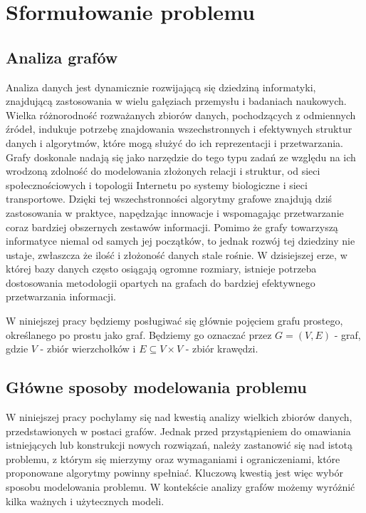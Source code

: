 \chapter{Sformułowanie problemu}

\section{Analiza grafów}

    Analiza danych jest dynamicznie rozwijającą się dziedziną informatyki, znajdującą zastosowania w wielu gałęziach przemysłu i badaniach naukowych. Wielka różnorodność rozważanych zbiorów danych, pochodzących z odmiennych źródeł, indukuje potrzebę znajdowania wszechstronnych i efektywnych struktur danych i algorytmów, które mogą służyć do ich reprezentacji i przetwarzania. Grafy doskonale nadają się jako narzędzie do tego typu zadań ze względu na ich wrodzoną zdolność do modelowania złożonych relacji i struktur, od sieci społecznościowych i topologii Internetu po systemy biologiczne i sieci transportowe. Dzięki tej wszechstronności algorytmy grafowe znajdują dziś zastosowania w praktyce, napędzając innowacje i wspomagając przetwarzanie coraz bardziej obszernych zestawów informacji. Pomimo że grafy towarzyszą informatyce niemal od samych jej początków, to jednak rozwój tej dziedziny nie ustaje, zwłaszcza że ilość i złożoność danych stale rośnie. W dzisiejszej erze, w której bazy danych często osiągają ogromne rozmiary, istnieje potrzeba dostosowania metodologii opartych na grafach do bardziej efektywnego przetwarzania informacji. 

    W niniejszej pracy będziemy posługiwać się głównie pojęciem grafu prostego, określanego po prostu jako graf. Będziemy go oznaczać przez $G = (V,E)$ - graf, gdzie $V$ - zbiór wierzchołków i $E \subseteq V \times V$ - zbiór krawędzi.

\section{Główne sposoby modelowania problemu}
    W niniejszej pracy pochylamy się nad kwestią analizy wielkich zbiorów danych, przedstawionych w postaci grafów. Jednak przed przystąpieniem do omawiania istniejących lub konstrukcji nowych rozwiązań, należy zastanowić się nad istotą problemu, z którym się mierzymy oraz wymaganiami i ograniczeniami, które proponowane algorytmy powinny spełniać. Kluczową kwestią jest więc wybór sposobu modelowania problemu. W kontekście analizy grafów możemy wyróżnić kilka ważnych i użytecznych modeli.
    
